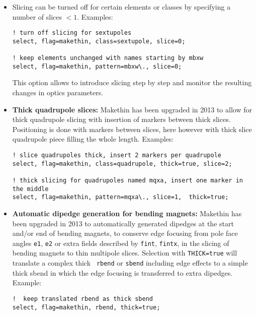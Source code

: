 \begin{itemize}
\item Slicing can be turned off for certain elements or classes by specifying
a number of slices $< 1$. Examples:
\begin{verbatim}
! turn off slicing for sextupoles
select, flag=makethin, class=sextupole, slice=0; 

! keep elements unchanged with names starting by mbxw
select, flag=makethin, pattern=mbxw\., slice=0; 
\end{verbatim}

This option allows to introduce slicing step by step and monitor the
resulting changes in optics parameters.

\item {\bf Thick quadrupole slices:}
Makethin has been upgraded in 2013 to allow for thick quadrupole slicing
with insertion of markers between thick slices. 
Positioning is done with markers between slices, here however with thick
slice quadrupole piece filling the whole length. 
Examples:
\begin{verbatim}
! slice quadrupoles thick, insert 2 markers per quadrupole
select, flag=makethin, class=quadrupole, thick=true, slice=2; 

! thick slicing for quadrupoles named mqxa, insert one marker in the middle
select, flag=makethin, pattern=mqxa\., slice=1,  thick=true; 
\end{verbatim}

\item {\bf Automatic dipedge generation for bending magnets:}
Makethin has been upgraded in 2013 to automatically generated dipedges
at the start and/or end of bending magnets, to conserve edge focusing
from pole face angles {\tt e1}, {\tt e2} or extra fields described by
{\tt fint}, {\tt fintx}, in the slicing of bending magnets to thin
multipole slices. 
Selection with {\tt THICK=true} will translate a complex thick {\tt
  rbend} or {\tt sbend} including edge effects to a simple thick
sbend in which the edge focusing is transferred to extra
dipedges. 
Example:
\begin{verbatim}
!  keep translated rbend as thick sbend
select, flag=makethin, rbend, thick=true;
\end{verbatim}
\end{itemize}


